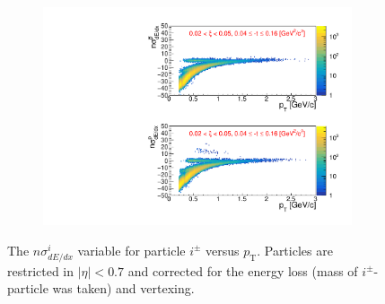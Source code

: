 \begin{figure}[h!]
\begin{subfigure}{.49\textwidth}
		\includegraphics[width=\linewidth, page=1]{chapters/chrgSTAR/img/dEdx/fit2019_2dNsigma_0_2.pdf}
	\end{subfigure}
	\begin{minipage}{.49\textwidth}{The $n\sigma^{i}_{dE/dx}$ variable for particle $i^\pm$ versus $p_\textrm{T}$. Particles are restricted in $|\eta| < 0.7$ and corrected for the energy loss (mass of $i^\pm$-particle was taken) and vertexing.}
		
	\end{minipage}
	
\end{figure}

